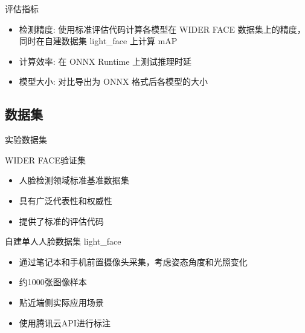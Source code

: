 \documentclass{beamer}
\begin{document}
\begin{frame}{评估指标}
    \begin{itemize}
        \item 检测精度: 使用标准评估代码计算各模型在 WIDER FACE 数据集上的精度，同时在自建数据集 light\_face 上计算 mAP
        \item 计算效率: 在 ONNX Runtime 上测试推理时延
        \item 模型大小: 对比导出为 ONNX 格式后各模型的大小
    \end{itemize}
\end{frame}

\subsection{数据集}
\begin{frame}{实验数据集}
    \begin{block}{WIDER FACE验证集}
        \begin{itemize}
            \item 人脸检测领域标准基准数据集
            \item 具有广泛代表性和权威性
            \item 提供了标准的评估代码
        \end{itemize}
    \end{block}

    \begin{block}{自建单人人脸数据集 light\_face}
        \begin{itemize}
            \item 通过笔记本和手机前置摄像头采集，考虑姿态角度和光照变化
            \item 约1000张图像样本
            \item 贴近端侧实际应用场景
            \item 使用腾讯云API进行标注
        \end{itemize}
    \end{block}
\end{frame}

\end{document}
